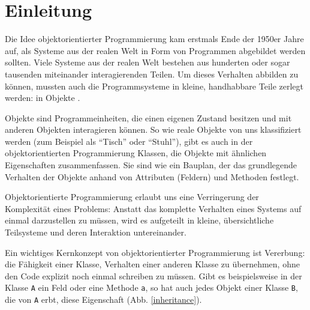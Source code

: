 \chapter{Einleitung} 
Die Idee objektorientierter Programmierung kam erstmals Ende der 1950er Jahre auf, als Systeme aus der realen Welt in Form von Programmen abgebildet werden sollten. Viele Systeme aus der realen Welt bestehen aus hunderten oder sogar tausenden miteinander interagierenden Teilen. Um dieses Verhalten abbilden zu können, mussten auch die Programmsysteme in kleine, handhabbare Teile zerlegt werden: in Objekte \cite{history}.

Objekte sind Programmeinheiten, die einen eigenen Zustand besitzen und mit anderen Objekten interagieren können. So wie reale Objekte von uns klassifiziert werden (zum Beispiel als ``Tisch'' oder ``Stuhl''), gibt es auch in der objektorientierten Programmierung Klassen, die Objekte mit ähnlichen Eigenschaften zusammenfassen. Sie sind wie ein Bauplan, der das grundlegende Verhalten der Objekte anhand von Attributen (Feldern) und Methoden festlegt.

Objektorientierte Programmierung erlaubt uns eine Verringerung der Komplexität eines Problems: Anstatt das komplette Verhalten eines Systems auf einmal darzustellen zu müssen, wird es aufgeteilt in kleine, übersichtliche Teilsysteme und deren Interaktion untereinander.

Ein wichtiges Kernkonzept von objektorientierter Programmierung ist Vererbung: die Fähigkeit einer Klasse, Verhalten einer anderen Klasse zu übernehmen, ohne den Code explizit noch einmal schreiben zu müssen. Gibt es beispielsweise in der Klasse \texttt{A} ein Feld oder eine Methode \texttt{a}, so hat auch jedes Objekt einer Klasse \texttt{B}, die von \texttt{A} erbt, diese Eigenschaft (Abb. \ref{inheritance}).

